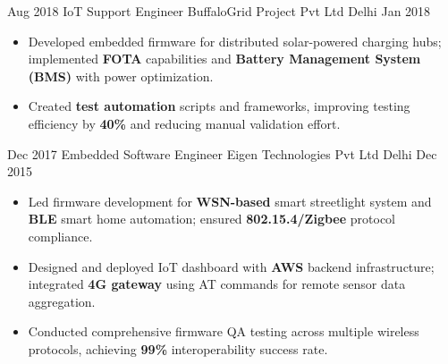 \begin{experiences}
\experience
  {Aug 2018}   %
  {IoT Support Engineer}  %
  {BuffaloGrid Project Pvt Ltd}  %
  {Delhi}  %
  {Jan 2018}  %
  {   %
      \begin{itemize}
          \item Developed embedded firmware for distributed solar-powered charging hubs; implemented \textbf{FOTA} capabilities and \textbf{Battery Management System (BMS)} with power optimization.
          \item Created \textbf{test automation} scripts and frameworks, improving testing efficiency by \textbf{40\%} and reducing manual validation effort.
      \end{itemize}    
  }
  {}

  \experience
  {Dec 2017}   %
  {Embedded Software Engineer}  %
  {Eigen Technologies Pvt Ltd}  %
  {Delhi}  %
  {Dec 2015}  %
  {   %
      \begin{itemize}
          \item Led firmware development for \textbf{WSN-based} smart streetlight system and \textbf{BLE} smart home automation; ensured \textbf{802.15.4/Zigbee} protocol compliance.
          \item Designed and deployed IoT dashboard with \textbf{AWS} backend infrastructure; integrated \textbf{4G gateway} using AT commands for remote sensor data aggregation.
          \item Conducted comprehensive firmware QA testing across multiple wireless protocols, achieving \textbf{99\%} interoperability success rate.
      \end{itemize}    
  }
  {}


    
\end{experiences}